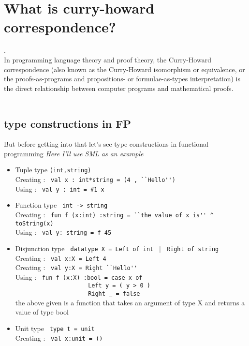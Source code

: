 \documentclass{article}
\begin{document}
\section{What is curry-howard correspondence?}.\\
In programming language theory and proof theory, the Curry-Howard correspondence (also known as the Curry-Howard
isomorphism or equivalence, or the proofs-as-programs and propositions- or formulae-as-types interpretation) is the
direct relationship between computer programs and mathematical proofs.\\ \\

\subsection{type constructions in FP}
But before getting into that let's see type constructions in functional programming \textit{Here I'll use SML as an example}

\begin{itemize}
\item Tuple type \verb|(int,string)|\\
  Creating : \verb| val x : int*string = (4 , ``Hello'')|\\
  Using : \verb| val y : int = #1 x|\\
\item Function type \verb| int -> string |\\
  Creating : \verb| fun f (x:int) :string = ``the value of x is'' ^ toString(x) |\\
  Using : \verb| val y: string = f 45|\\

\item Disjunction type \verb| datatype X = Left of int | $|$  \verb| Right of string |\\
  Creating : \verb| val x:X = Left 4|\\
  Creating : \verb| val y:X = Right ``Hello'' |\\
  Using : \verb| fun f (x:X) :bool = case x of |\\
  	  \verb|                     Left y = ( y > 0 )|\\
          \verb|                     Right _ = false|\\
  the above given is a function that takes an argument of type X and returns a value of type bool\\
          
\item Unit type \verb| type t = unit |\\
  Creating : \verb| val x:unit = () |\\
          
\end{itemize}
\end{document}
